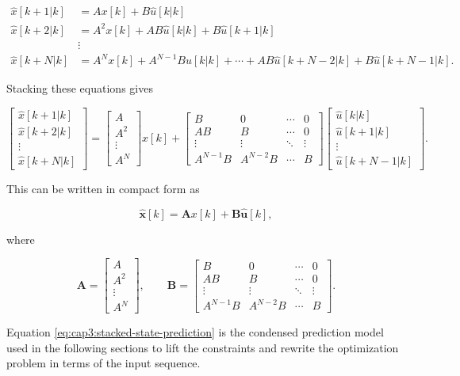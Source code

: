 \noindent
\begin{align}
	\hat{x}[k+1|k] &= A x[k] + B \hat{u}[k|k] \\
	\hat{x}[k+2|k] &= A^2 x[k] + A B \hat{u}[k|k] + B \hat{u}[k+1|k] \\
	&\vdots \\
	\hat{x}[k+N|k] &= A^N x[k] + A^{N - 1} B \hat{u}[k|k] + \cdots + A B \hat{u}[k +N - 2|k] + B \hat{u}[k + N - 1|k].
\end{align}

\noindent
Stacking these equations gives

\noindent
\begin{equation}
	\left[
		\begin{matrix}
			\hat{x}[k+1|k] \\
			\hat{x}[k+2|k] \\
			\vdots \\
			\hat{x}[k+N|k]
		\end{matrix}
	\right] =
	\left[
		\begin{matrix}
			A \\
			A^2 \\
			\vdots \\
			A^N
		\end{matrix}
	\right]
	x[k] +
	\left[
		\begin{matrix}
			B & 0 & \cdots & 0 \\
			AB & B & \cdots & 0 \\
			\vdots & \vdots & \ddots & \vdots \\
			A^{N-1}B & A^{N-2}B & \cdots & B
		\end{matrix}
	\right]
	\left[
		\begin{matrix}
			\hat{u}[k|k] \\
			\hat{u}[k+1|k]\\
			\vdots \\
			\hat{u}[k+N-1|k]
		\end{matrix}
	\right].
\end{equation}

\noindent
This can be written in compact form as

\noindent
\begin{equation}
	\label{eq:cap3:stacked-state-prediction}
	\mathbf{\hat{x}}[k] = \mathbf{A}x[k] + \mathbf{B}\mathbf{\hat{u}}[k],
\end{equation}

\noindent
where

\noindent
\begin{equation}
	\mathbf{A} = \left[
		\begin{matrix}
			A \\
			A^2 \\
			\vdots \\
			A^N
		\end{matrix}
	\right],
	\qquad
	\mathbf{B} = \left[
		\begin{matrix}
			B  & 0 & \cdots & 0 \\
			AB & B & \cdots & 0 \\
			\vdots  & \vdots & \ddots & \vdots \\
			A^{N-1}B & A^{N-2}B & \cdots & B
		\end{matrix}
	\right].
\end{equation}

Equation \eqref{eq:cap3:stacked-state-prediction} is the condensed prediction model used in the following sections to lift the constraints and rewrite the optimization problem in terms of the input sequence.
